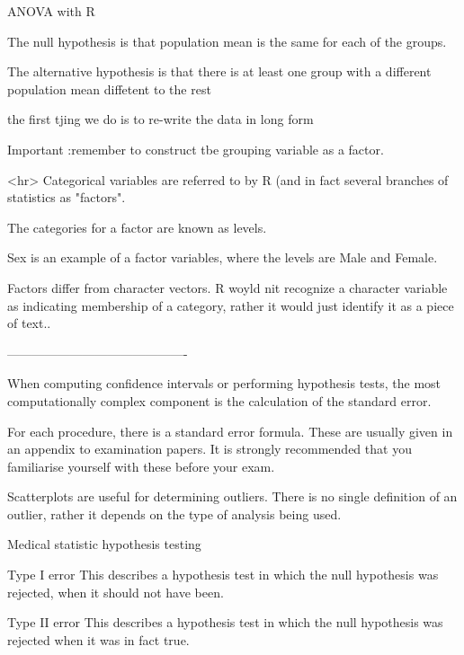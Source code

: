 ANOVA with R
 
The null hypothesis is that population mean is the same for each of the groups.
 
The alternative hypothesis is that there is at least  one group with a different population mean diffetent to the rest
 
the first tjing we do is to re-write the data in long form
 
Important :remember to construct tbe grouping variable as a factor. 


<hr>
Categorical variables are referred to by R (and in fact several branches of statistics as "factors". 

The categories for a factor are known as levels. 

Sex is an example of a factor variables, where the levels are Male and Female. 

Factors differ from character vectors. R woyld nit recognize a character variable as indicating membership of a category, rather it would just identify it as a piece of text..


 
-------------------------------------------

 
When computing confidence intervals or performing hypothesis tests, the most computationally complex component is the calculation of the standard error.
 
For each procedure, there is a standard error formula. These are usually given in an appendix to examination papers. It is strongly recommended that you familiarise yourself with these before your exam.



Scatterplots are useful for determining outliers. There is no single definition of an outlier, rather it depends on the type of analysis being used.


Medical statistic hypothesis testing
 
Type I error This describes a hypothesis test in which the null hypothesis was rejected, when it should not have been. 

Type II error This describes a hypothesis test in which the null hypothesis was rejected when it was in fact true.
 
